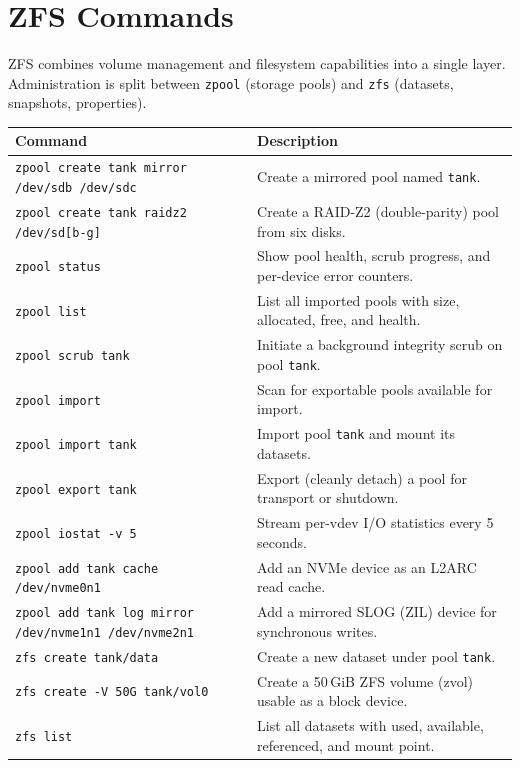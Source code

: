 \section*{ZFS Commands}

ZFS combines volume management and filesystem capabilities into a single
layer. Administration is split between \texttt{zpool} (storage pools) and
\texttt{zfs} (datasets, snapshots, properties).

\begin{longtable}{p{4cm} p{8cm}}
\toprule
\textbf{Command} & \textbf{Description} \\
\midrule
\endhead
\texttt{zpool create tank mirror /dev/sdb /dev/sdc} & Create a mirrored pool named \texttt{tank}. \\
\texttt{zpool create tank raidz2 /dev/sd[b-g]} & Create a RAID-Z2 (double-parity) pool from six disks. \\
\texttt{zpool status} & Show pool health, scrub progress, and per-device error counters. \\
\texttt{zpool list} & List all imported pools with size, allocated, free, and health. \\
\texttt{zpool scrub tank} & Initiate a background integrity scrub on pool \texttt{tank}. \\
\texttt{zpool import} & Scan for exportable pools available for import. \\
\texttt{zpool import tank} & Import pool \texttt{tank} and mount its datasets. \\
\texttt{zpool export tank} & Export (cleanly detach) a pool for transport or shutdown. \\
\texttt{zpool iostat -v 5} & Stream per-vdev I/O statistics every 5 seconds. \\
\texttt{zpool add tank cache /dev/nvme0n1} & Add an NVMe device as an L2ARC read cache. \\
\texttt{zpool add tank log mirror /dev/nvme1n1 /dev/nvme2n1} & Add a mirrored SLOG (ZIL) device for synchronous writes. \\
\midrule
\texttt{zfs create tank/data} & Create a new dataset under pool \texttt{tank}. \\
\texttt{zfs create -V 50G tank/vol0} & Create a 50\,GiB ZFS volume (zvol) usable as a block device. \\
\texttt{zfs list} & List all datasets with used, available, referenced, and mount point. \\

\end{longtable}
